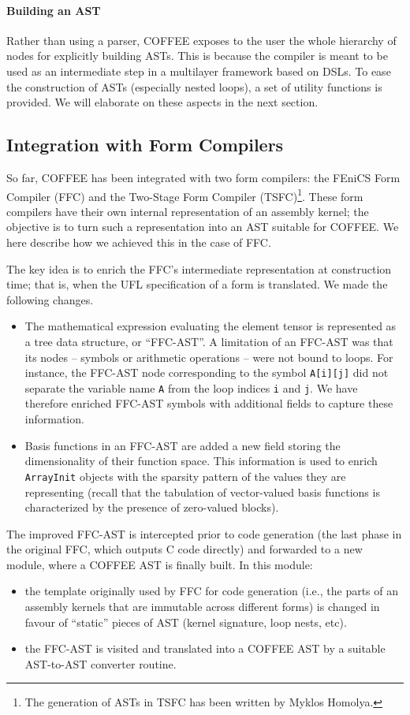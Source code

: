 \paragraph{Building an AST}
Rather than using a parser, COFFEE exposes to the user the whole hierarchy of nodes for explicitly building ASTs. This is because the compiler is meant to be used as an intermediate step in a multilayer framework based on DSLs. To ease the construction of ASTs (especially nested loops), a set of utility functions is provided. We will elaborate on these aspects in the next section.

\subsection{Integration with Form Compilers}
So far, COFFEE has been integrated with two form compilers: the FEniCS Form Compiler (FFC) and the Two-Stage Form Compiler (TSFC)\footnote{The generation of ASTs in TSFC has been written by Myklos Homolya.}. These form compilers have their own internal representation of an assembly kernel; the objective is to turn such a representation into an AST suitable for COFFEE. We here describe how we achieved this in the case of FFC.

The key idea is to enrich the FFC's intermediate representation at construction time; that is, when the UFL specification of a form is translated. We made the following changes.
\begin{itemize}
\item The mathematical expression evaluating the element tensor is represented as a tree data structure, or ``FFC-AST''. A limitation of an FFC-AST was that its nodes -- symbols or arithmetic operations -- were not bound to loops. For instance, the FFC-AST node corresponding to the symbol \texttt{A[i][j]} did not separate the variable name \texttt{A} from the loop indices \texttt{i} and \texttt{j}. We have therefore enriched FFC-AST symbols with additional fields to capture these information.
\item Basis functions in an FFC-AST are added a new field storing the dimensionality of their function space. This information is used to enrich \texttt{ArrayInit} objects with the sparsity pattern of the values they are representing (recall that the tabulation of vector-valued basis functions is characterized by the presence of zero-valued blocks).
\end{itemize}

The improved FFC-AST is intercepted prior to code generation (the last phase in the original FFC, which outputs C code directly) and forwarded to a new module, where a COFFEE AST is finally built. In this module:
\begin{itemize}
\item the template originally used by FFC for code generation (i.e., the parts of an assembly kernels that are immutable across different forms) is changed in favour of ``static'' pieces of AST (kernel signature, loop nests, etc).
\item the FFC-AST is visited and translated into a COFFEE AST by a suitable AST-to-AST converter routine.
\end{itemize}

